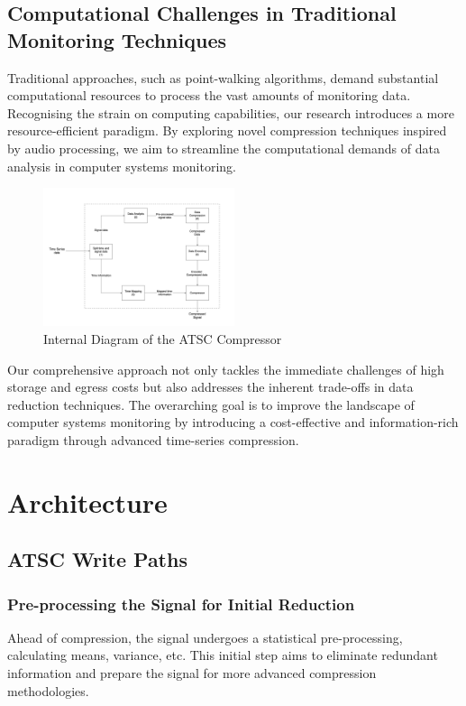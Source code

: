 \documentclass[conference]{IEEEtran}
\begin{document}
\subsection{Computational Challenges in Traditional Monitoring Techniques}
Traditional approaches, such as point-walking algorithms, demand substantial computational resources to process the vast amounts of monitoring data. Recognising the strain on computing capabilities, our research introduces a more resource-efficient paradigm. By exploring novel compression techniques inspired by audio processing, we aim to streamline the computational demands of data analysis in computer systems monitoring. 

  
\begin{figure}[h]
  \centering
  \includegraphics[width=0.5\textwidth]{Fig2.png}
  \caption{Internal Diagram of the ATSC Compressor}
  \label{Fig.2}
\end{figure}

Our comprehensive approach not only tackles the immediate challenges of high storage and egress costs but also addresses the inherent trade-offs in data reduction techniques. The overarching goal is to improve the landscape of computer systems monitoring by introducing a cost-effective and information-rich paradigm through advanced time-series compression. 



\section{Architecture}

\subsection{ATSC Write Paths}

\subsubsection{Pre-processing the Signal for Initial Reduction}
Ahead of compression, the signal undergoes a statistical pre-processing, calculating means, variance, etc. This initial step aims to eliminate redundant information and prepare the signal for more advanced compression methodologies.
\end{document}

